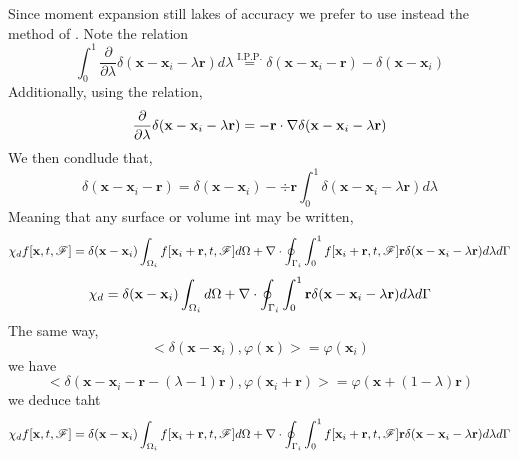 \documentclass[12pt]{My_preprint}
\begin{document}
Since moment expansion still lakes of accuracy we prefer to use instead the method of \citet{pahtz2023general}.
Note the relation 
\begin{equation}
    \int_0^1 
    \frac{\partial}{\partial \lambda}\delta(\textbf{x} - \textbf{x}_i - \lambda \textbf{r})
    d\lambda
    \overset{\text {I.P.P.}}{=} 
    \delta(\textbf{x} - \textbf{x}_i - \textbf{r})
    - \delta(\textbf{x} - \textbf{x}_i)
\end{equation}
Additionally, using the relation, 
\begin{equation}
    \frac{\partial}{\partial \lambda}\delta(\textbf{x} - \textbf{x}_i - \lambda \textbf{r})
    =
    - \textbf{r}
    \cdot \grad
    \delta(\textbf{x} - \textbf{x}_i - \lambda \textbf{r})
\end{equation}
We then condlude that,
\begin{equation}
    \delta(\textbf{x}  - \textbf{x}_i - \textbf{r})
    =
    \delta(\textbf{x} - \textbf{x}_i)
    -
    \div \textbf{r}  
    \int_0^1 
    \delta(\textbf{x} - \textbf{x}_i - \lambda \textbf{r})
    d\lambda
\end{equation}
Meaning that any surface or volume int may be written, 
\begin{equation}
    \chi_d f[\textbf{x},t,\FF]
    = 
    \delta(\textbf{x} - \textbf{x}_i)
    \intO[i]{f[\textbf{x}_i+\textbf{r},t,\FF]}
    +
    \div 
    \intS[i]{
    \int_0^1 
    f[\textbf{x}_i+\textbf{r},t,\FF]\textbf{r}  
    \delta(\textbf{x} - \textbf{x}_i - \lambda \textbf{r})
    d\lambda}
\end{equation}
\begin{equation}
    \chi_d 
    = 
    \delta(\textbf{x} - \textbf{x}_i)
    \intO[i]{}
    +
    \div 
    \intS[i]{
    \int_0^1 
    \textbf{r}  
    \delta(\textbf{x} - \textbf{x}_i - \lambda \textbf{r})
    d\lambda}
\end{equation}
The same way, 
\begin{equation}
    <\delta(\textbf{x}- \textbf{x}_i),\varphi(\textbf{x})>
    = \varphi(\textbf{x}_i)
\end{equation}
we have 
\begin{equation}
    <\delta(\textbf{x}- \textbf{x}_i - \textbf{r} -(\lambda - 1)\textbf{r}),\varphi(\textbf{x}_i + \textbf{r})>
    = \varphi(\textbf{x} + (1 - \lambda)\textbf{r})
\end{equation}
we deduce taht
\begin{equation}
    \chi_d f[\textbf{x},t,\FF]
    = 
    \delta(\textbf{x} - \textbf{x}_i)
    \intO[i]{f[\textbf{x}_i+\textbf{r},t,\FF]}
    +
    \div 
    \intS[i]{
    \int_0^1 
    f[\textbf{x}_i+\textbf{r},t,\FF]\textbf{r}  
    \delta(\textbf{x} - \textbf{x}_i - \lambda \textbf{r})
    d\lambda}
\end{equation}
\end{document}
